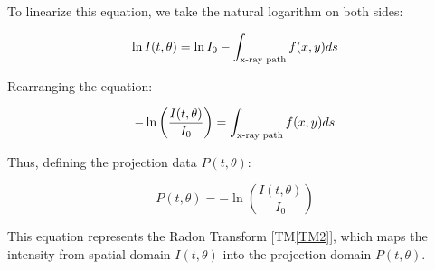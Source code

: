 \documentclass[12pt]{article}
\begin{document}
To linearize this equation, we take the natural logarithm on both sides:

\begin{equation}
    \ln I(t, \theta) = \ln I_0 - \int_{\textnormal{x-ray path}} f(x,y) ds
\end{equation}

Rearranging the equation:

\begin{equation}
    -\ln \left( \frac{I(t, \theta)}{I_0} \right) = \int_{\textnormal{x-ray path}} f(x,y) ds
\end{equation}

Thus, defining the projection data \( P(t, \theta) \):

\begin{equation}
    P(t,\theta) = -\ln(\frac{I(t,\theta)}{I_0})
\end{equation}

This equation represents the Radon Transform [TM\ref{TM2}], which maps the
intensity from spatial domain $I(t, \theta)$ into the projection domain $P(t, \theta)$.


~\newline
\end{document}
